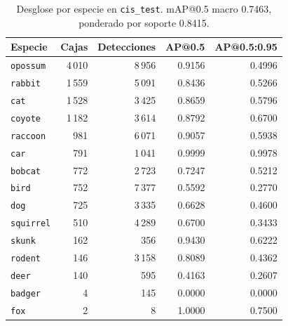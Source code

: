 \begin{table}[t]
  \centering
  \small
  \begin{tabular}{lrrrr}
    \toprule
    Especie & Cajas & Detecciones & AP@0.5 & AP@0.5:0.95 \\
    \midrule
    \texttt{opossum} & 4\,010 & 8\,956 & 0.9156 & 0.4996 \\
    \texttt{rabbit} & 1\,559 & 5\,091 & 0.8436 & 0.5266 \\
    \texttt{cat} & 1\,528 & 3\,425 & 0.8659 & 0.5796 \\
    \texttt{coyote} & 1\,182 & 3\,614 & 0.8792 & 0.6700 \\
    \texttt{raccoon} & 981 & 6\,071 & 0.9057 & 0.5938 \\
    \texttt{car} & 791 & 1\,041 & 0.9999 & 0.9978 \\
    \texttt{bobcat} & 772 & 2\,723 & 0.7247 & 0.5212 \\
    \texttt{bird} & 752 & 7\,377 & 0.5592 & 0.2770 \\
    \texttt{dog} & 725 & 3\,335 & 0.6628 & 0.4600 \\
    \texttt{squirrel} & 510 & 4\,289 & 0.6700 & 0.3433 \\
    \texttt{skunk} & 162 & 356 & 0.9430 & 0.6222 \\
    \texttt{rodent} & 146 & 3\,158 & 0.8089 & 0.4362 \\
    \texttt{deer} & 140 & 595 & 0.4163 & 0.2607 \\
    \texttt{badger} & 4 & 145 & 0.0000 & 0.0000 \\
    \texttt{fox} & 2 & 8 & 1.0000 & 0.7500 \\
    \bottomrule
  \end{tabular}
  \caption{Desglose por especie en \texttt{cis\_test}. mAP@0.5 macro 0.7463, ponderado por soporte 0.8415.}
  \label{tab:especies_cis_test}
\end{table}
